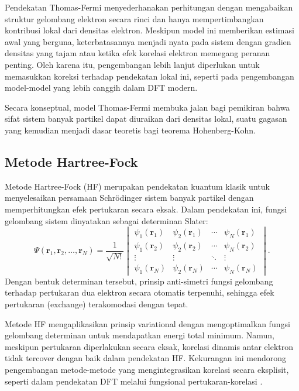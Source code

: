 Pendekatan Thomas-Fermi menyederhanakan perhitungan dengan mengabaikan struktur gelombang elektron secara rinci dan hanya mempertimbangkan kontribusi lokal dari densitas elektron. Meskipun model ini memberikan estimasi awal yang berguna, keterbatasannya menjadi nyata pada sistem dengan gradien densitas yang tajam atau ketika efek korelasi elektron memegang peranan penting. Oleh karena itu, pengembangan lebih lanjut diperlukan untuk memasukkan koreksi terhadap pendekatan lokal ini, seperti pada pengembangan model-model yang lebih canggih dalam DFT modern.

Secara konseptual, model Thomas-Fermi membuka jalan bagi pemikiran bahwa sifat sistem banyak partikel dapat diuraikan dari densitas lokal, suatu gagasan yang kemudian menjadi dasar teoretis bagi teorema Hohenberg-Kohn.

\subsection{Metode Hartree-Fock}
Metode Hartree-Fock (HF) merupakan pendekatan kuantum klasik untuk menyelesaikan persamaan Schrödinger sistem banyak partikel dengan memperhitungkan efek pertukaran secara eksak. Dalam pendekatan ini, fungsi gelombang sistem dinyatakan sebagai determinan Slater:
\begin{equation}
    \Psi(\mathbf{r}_1,\mathbf{r}_2,\ldots,\mathbf{r}_N) = \frac{1}{\sqrt{N!}}
    \begin{vmatrix}
    \psi_1(\mathbf{r}_1) & \psi_2(\mathbf{r}_1) & \cdots & \psi_N(\mathbf{r}_1) \\
    \psi_1(\mathbf{r}_2) & \psi_2(\mathbf{r}_2) & \cdots & \psi_N(\mathbf{r}_2) \\
    \vdots & \vdots & \ddots & \vdots \\
    \psi_1(\mathbf{r}_N) & \psi_2(\mathbf{r}_N) & \cdots & \psi_N(\mathbf{r}_N)
    \end{vmatrix}.
\end{equation}
Dengan bentuk determinan tersebut, prinsip anti-simetri fungsi gelombang terhadap pertukaran dua elektron secara otomatis terpenuhi, sehingga efek pertukaran (exchange) terakomodasi dengan tepat.

Metode HF mengaplikasikan prinsip variational dengan mengoptimalkan fungsi gelombang determinan untuk mendapatkan energi total minimum. Namun, meskipun pertukaran diperlakukan secara eksak, korelasi dinamis antar elektron tidak tercover dengan baik dalam pendekatan HF. Kekurangan ini mendorong pengembangan metode-metode yang mengintegrasikan korelasi secara eksplisit, seperti dalam pendekatan DFT melalui fungsional pertukaran-korelasi \citep{szabo_modern_1989}.

